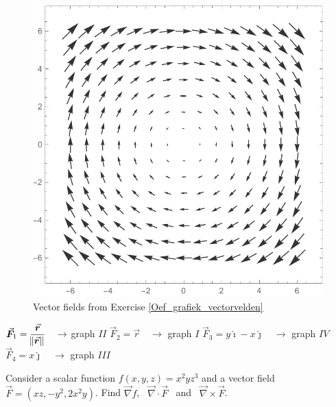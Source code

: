 \begin{Exercise}[difficulty = 2]
\begin{figure}[H]
	\includegraphics[scale=0.4]{fig_Vector_Calc_33d}
	\caption{Vector fields from Exercise \ref{Oef_grafiek_vectorvelden} }
	\label{fig_Vector_Calc_33}
\end{figure}
\end{Exercise}

\begin{Answer}
    \begin{multicols}{2}
    
        \Question $\vec F_1 = \dfrac{\vec r}{\norm{\vec r}} \quad \rightarrow$ graph $II$
        \Question $\vec F_2 = \vec r  \quad  \rightarrow$ graph $I$
        \Question $\vec F_3 = y \hat{\imath} - x \hat{\jmath}  \quad  \rightarrow$ graph $IV$
        \Question $\vec F_4 = x \hat{\jmath}  \quad  \rightarrow$ graph $III$
    \EndCurrentQuestion
    \end{multicols}
\end{Answer}

\begin{Exercise}[difficulty = 1] Consider a scalar function $f(x,y,z)=x^2yz^3$ and a vector field $\vec F = (xz, -y^2, 2x^2y)$. Find $ \vec{\nabla} f$, \, $\vec{\nabla}  \cdot \vec F$ \, and \, $ \vec{\nabla} \times \vec F $.
\end{Exercise}

